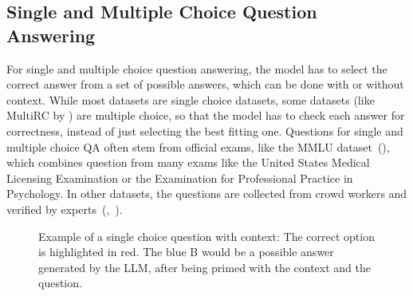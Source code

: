 \subsection{Single and Multiple Choice Question Answering}\label{sec:multiple-choice-qa}
For single and multiple choice question answering, the model has to select the correct answer from a set of possible answers, which can be done with or without context.
While most datasets are single choice datasets, some datasets (like MultiRC by \cite{khashabi:2018:Looking}) are multiple choice, so that the model has to check each answer for correctness, instead of just selecting the best fitting one.
Questions for single and multiple choice QA often stem from official exams, like the MMLU dataset~(\cite{hendrycks:2020:Measuring}), which combines question from many exams like the United States Medical Licensing Examination or the Examination for Professional Practice in Psychology.
In other datasets, the questions are collected from crowd workers and verified by experts~(\cite{clark:2018:Think},~\cite{mihaylov:2018:Can}).
\\
\begin{figure}[tb]
    \centering
    \caption{Example of a single choice question with context: The correct option is highlighted in red.
    The blue B would be a possible answer generated by the LLM, after being primed with the context and the question.
    }\label{fig:mc_example}
\end{figure}
